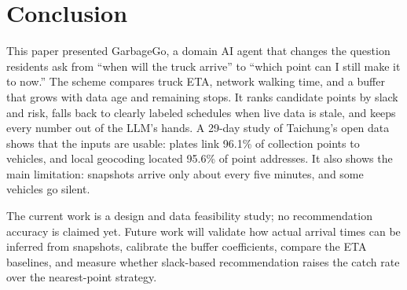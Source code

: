 \section{Conclusion}\label{sec:conclusion}
This paper presented GarbageGo, a domain AI agent that changes the
question residents ask from ``when will the truck arrive'' to ``which
point can I still make it to now.'' The scheme compares truck ETA, network
walking time, and a buffer that grows with data age and remaining stops.
It ranks candidate points by slack and risk, falls back to clearly labeled
schedules when live data is stale, and keeps every number out of the
LLM's hands. A 29-day study of Taichung's open data shows that the inputs
are usable: plates link 96.1\% of collection points to vehicles, and local
geocoding located 95.6\% of point addresses. It also shows the main
limitation: snapshots arrive only about every five minutes, and some
vehicles go silent.

The current work is a design and data feasibility study; no
recommendation accuracy is claimed yet. Future work will validate how
actual arrival times can be inferred from snapshots, calibrate the buffer
coefficients, compare the ETA baselines, and measure whether slack-based
recommendation raises the catch rate over the nearest-point strategy.

